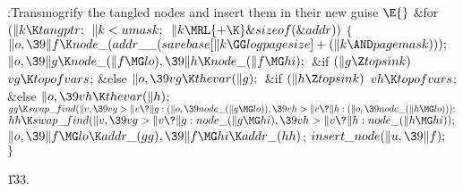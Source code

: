 \Y\B\4:Transmogrify the tangled nodes and insert them in their new guise%
\X${}\E{}$\6
\&{for} ${}(\|k\K\\{tangptr};{}$ ${}\|k<\\{umask};{}$ ${}\|k\MRL{+{\K}}%
\&{sizeof}(\&{addr})){}$\5
${}\{{}$\1\6
${}\|o,\39\|f\K\\{node\_}(\\{addr\_\_}(\\{savebase}[\|k\GG\\{logpagesize}]+(\|k%
\AND\\{pagemask})));{}$\6
${}\|o,\39\|g\K\\{node\_}(\|f\MG\\{lo}),\39\|h\K\\{node\_}(\|f\MG\\{hi});{}$\6
\&{if} ${}(\|g\Z\\{topsink}){}$\1\5
${}\\{vg}\K\\{topofvars}{}$;\5
\2\&{else}\1\5
${}\|o,\39\\{vg}\K\\{thevar}(\|g);{}$\2\6
\&{if} ${}(\|h\Z\\{topsink}){}$\1\5
${}\\{vh}\K\\{topofvars}{}$;\5
\2\&{else}\1\5
${}\|o,\39\\{vh}\K\\{thevar}(\|h){}$;\2\6
${}\\{gg}\K\\{swap\_find}(\|v,\39\\{vg}>\|v\?\|g:(\|o,\39\\{node\_}(\|g\MG%
\\{lo})),\39\\{vh}>\|v\?\|h:(\|o,\39\\{node\_}(\|h\MG\\{lo})));{}$\6
${}\\{hh}\K\\{swap\_find}(\|v,\39\\{vg}>\|v\?\|g:\\{node\_}(\|g\MG\\{hi}),\39%
\\{vh}>\|v\?\|h:\\{node\_}(\|h\MG\\{hi}));{}$\6
${}\|o,\39\|f\MG\\{lo}\K\\{addr\_}(\\{gg}),\39\|f\MG\\{hi}\K\\{addr\_}(%
\\{hh}){}$;\6
${}\\{insert\_node}(\|u,\39\|f);{}$\6
\4${}\}{}$\2\par
\U133.\fi


